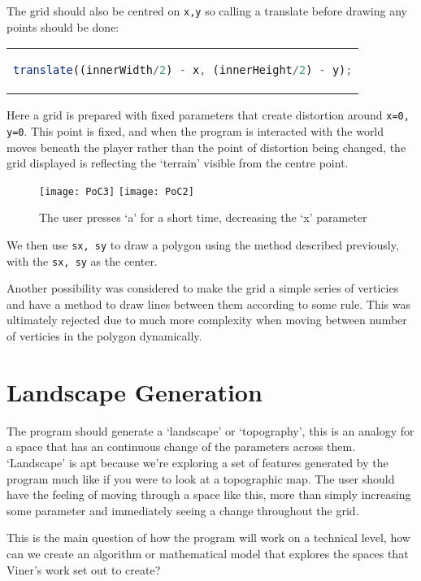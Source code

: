 The grid should also be centred on \verb|x,y| so calling a translate before
drawing any points should be done:
\begin{center}
\begin{tabular}{c}
\begin{lstlisting}[language=JavaScript]
translate((innerWidth/2) - x, (innerHeight/2) - y);
\end{lstlisting}
\end{tabular}
\end{center}

Here a grid is prepared with fixed parameters that create distortion around
\verb|x=0, y=0|. This point is fixed, and when the program is interacted with
the world moves beneath the player rather than the point of distortion being
changed, the grid displayed is reflecting the `terrain' visible from the centre
point.

\begin{figure}[H]
\centering
\texttt{[image: PoC3]}
\hspace*{0.5cm}
\texttt{[image: PoC2]}
\caption{The user presses `a' for a short time, decreasing the `x' parameter}
\label{demomovement}
\end{figure}

We then use \verb|sx, sy| to draw a polygon using the method described
previously, with the \verb|sx, sy| as the center.

Another possibility was considered to make the grid a simple series of verticies
and have a method to draw lines between them according to some rule. This was
ultimately rejected due to much more complexity when moving between number of
verticies in the polygon dynamically.

\section{Landscape Generation}
\label{landgen}
The program should generate a `landscape' or `topography', this is an analogy for
a space that has an continuous change of the parameters across them. `Landscape'
is apt because we're exploring a set of features generated by the program much
like if you were to look at a topographic map. The user should have the feeling
of moving through a space like this, more than simply increasing some parameter
and immediately seeing a change throughout the grid.

This is the main question of how the program will work on a technical level, how
can we create an algorithm or mathematical model that explores the spaces that
Viner's work set out to create?

